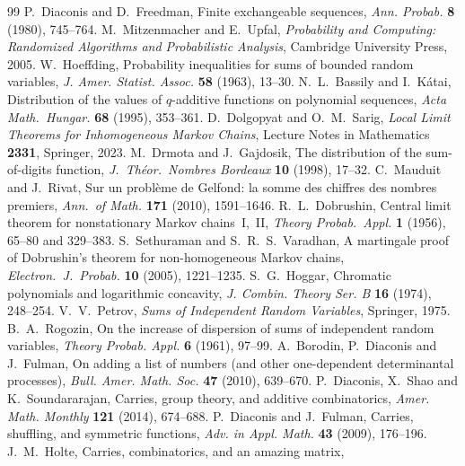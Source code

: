 \documentclass[11pt]{article}
\theoremstyle{definition}
\theoremstyle{remark}
\begin{document}
\begin{thebibliography}{99}
 P.~Diaconis and D.~Freedman, Finite exchangeable
  sequences, \emph{Ann. Probab.} \textbf{8} (1980), 745--764.
 M.~Mitzenmacher and E.~Upfal, \emph{Probability and
  Computing: Randomized Algorithms and Probabilistic Analysis}, Cambridge
  University Press, 2005.
 W.~Hoeffding, Probability inequalities for sums of bounded
  random variables, \emph{J. Amer. Statist. Assoc.} \textbf{58} (1963), 13--30.
 N.~L.~Bassily and I.~K\'atai, Distribution of the values
of $q$-additive functions on polynomial sequences, \emph{Acta Math.\ Hungar.}
\textbf{68} (1995), 353--361.
 D.~Dolgopyat and O.~M.~Sarig, \emph{Local Limit Theorems
for Inhomogeneous Markov Chains}, Lecture Notes in Mathematics \textbf{2331},
Springer, 2023.
 M.~Drmota and J.~Gajdosik, The distribution of the
sum-of-digits function, \emph{J.\ Th\'eor.\ Nombres Bordeaux} \textbf{10} (1998),
17--32.
 C.~Mauduit and J.~Rivat, Sur un probl\`eme de Gelfond:
la somme des chiffres des nombres premiers, \emph{Ann.\ of Math.} \textbf{171}
(2010), 1591--1646.
 R.~L.~Dobrushin, Central limit theorem for nonstationary
Markov chains~I,~II, \emph{Theory Probab.\ Appl.} \textbf{1} (1956), 65--80 and
329--383.
 S.~Sethuraman and S.~R.~S.~Varadhan, A martingale
proof of Dobrushin's theorem for non-homogeneous Markov chains,
\emph{Electron.\ J.\ Probab.} \textbf{10} (2005), 1221--1235.
 S.~G.~Hoggar, Chromatic polynomials and logarithmic
  concavity, \emph{J. Combin. Theory Ser. B} \textbf{16} (1974), 248--254.
 V.~V.~Petrov, \emph{Sums of Independent Random Variables},
  Springer, 1975.
 B.~A.~Rogozin, On the increase of dispersion of sums of
  independent random variables, \emph{Theory Probab. Appl.} \textbf{6} (1961),
  97--99.
 A.~Borodin, P.~Diaconis and J.~Fulman, On adding a
  list of numbers (and other one-dependent determinantal processes),
  \emph{Bull. Amer. Math. Soc.} \textbf{47} (2010), 639--670.
 P.~Diaconis, X.~Shao and K.~Soundararajan,
  Carries, group theory, and additive combinatorics, \emph{Amer. Math.
  Monthly} \textbf{121} (2014), 674--688.
 P.~Diaconis and J.~Fulman, Carries, shuffling, and
  symmetric functions, \emph{Adv. in Appl. Math.} \textbf{43} (2009), 176--196.
 J.~M.~Holte, Carries, combinatorics, and an amazing matrix,

\end{thebibliography}
\end{document}
